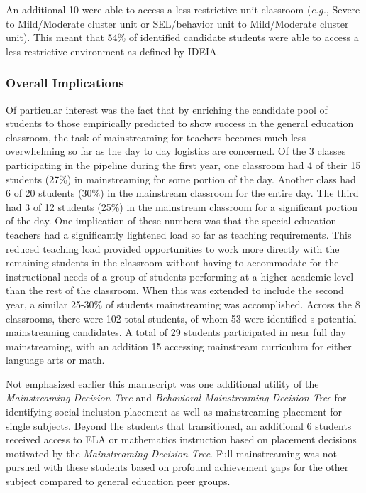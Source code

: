\documentclass[twoside]{article}
\begin{document}
An additional 10 were able to access a less restrictive unit classroom (\textit{e.g.}, Severe to Mild/Moderate cluster unit or SEL/behavior unit to Mild/Moderate cluster unit). This meant that 54\% of identified candidate students were able to access a less restrictive environment as defined by IDEIA. 

\subsubsection{Overall Implications}

Of particular interest was the fact that by enriching the candidate pool of students to those empirically predicted to show success in the general education classroom, the task of mainstreaming for teachers becomes much less overwhelming so far as the day to day logistics are concerned. Of the 3 classes participating in the pipeline during the first year, one classroom had 4 of their 15 students (27\%) in mainstreaming for some portion of the day. Another class had 6 of 20 students (30\%) in the mainstream classroom for the entire day. The third had 3 of 12 students (25\%) in the mainstream classroom for a significant portion of the day. One implication of these numbers was that the special education teachers had a significantly lightened load so far as teaching requirements. This reduced teaching load provided opportunities to work more directly with the remaining students in the classroom without having to accommodate for the instructional needs of a group of students performing at a higher academic level than the rest of the classroom. When this was extended to include the second year, a similar 25-30\% of students mainstreaming was accomplished. Across the 8 classrooms, there were 102 total students, of whom 53 were identified s potential mainstreaming candidates. A total of 29 students participated in near full day mainstreaming, with an addition 15 accessing mainstream curriculum for either language arts or math. 

Not emphasized earlier this manuscript was one additional utility of the \textit{Mainstreaming Decision Tree} and \textit{Behavioral Mainstreaming Decision Tree} for identifying social inclusion placement as well as mainstreaming placement for single subjects. Beyond the students that transitioned, an additional 6 students received access to ELA or mathematics instruction based on placement decisions motivated by the \textit{Mainstreaming Decision Tree}. Full mainstreaming was not pursued with these students based on profound achievement gaps for the other subject compared to general education peer groups. 
\end{document}
